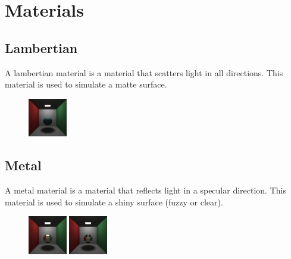 \documentclass{article}
\begin{document}
\section{Materials}



    \subsection{Lambertian}
    A lambertian material is a material that scatters light in all directions. This material is used to simulate a matte surface. \par
    \begin{figure}[h!]
        \centering
        \includegraphics[width=0.15\textwidth]{samples/LambertianSphere.png}
    \end{figure}


    \subsection{Metal}
    A metal material is a material that reflects light in a specular direction. This material is used to simulate a shiny surface (fuzzy or clear). \par
    \begin{figure}[h!]
        \centering
        \includegraphics[width=0.15\textwidth]{samples/MetalSphereFuzz.png}
        \includegraphics[width=0.15\textwidth]{samples/MetalSphereNoFuzz.png}
    \end{figure}
\end{document}
